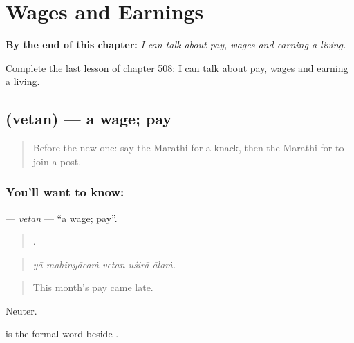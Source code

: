 
\chapter{Wages and Earnings}
\label{ch:mr-wages-and-earnings}

\begin{chapteropening}
\textbf{By the end of this chapter:} \emph{I can talk about pay, wages and earning a living.}

Complete the last lesson of chapter 508: I can talk about pay, wages and earning a living.
\end{chapteropening}

\section[\texorpdfstring{\mr{वेतन} (vetan)}{वेतन (vetan)}]{ (vetan) — a wage; pay}

\label{lesson:MR-C508-vetan}



\begin{quote}
Before the new one: say the Marathi for a knack, then the Marathi for to join a post.
\end{quote}

\subsection*{You'll want to know: }
\textbf{} — \emph{vetan} — \textquotedblleft{}a wage; pay\textquotedblright{}.

\begin{quote}
    .
\end{quote}

\begin{quote}
\emph{yā mahinyācaṁ vetan uśirā ālaṁ.}
\end{quote}

\begin{quote}
This month's pay came late.
\end{quote}

Neuter.

 is the formal word beside .

